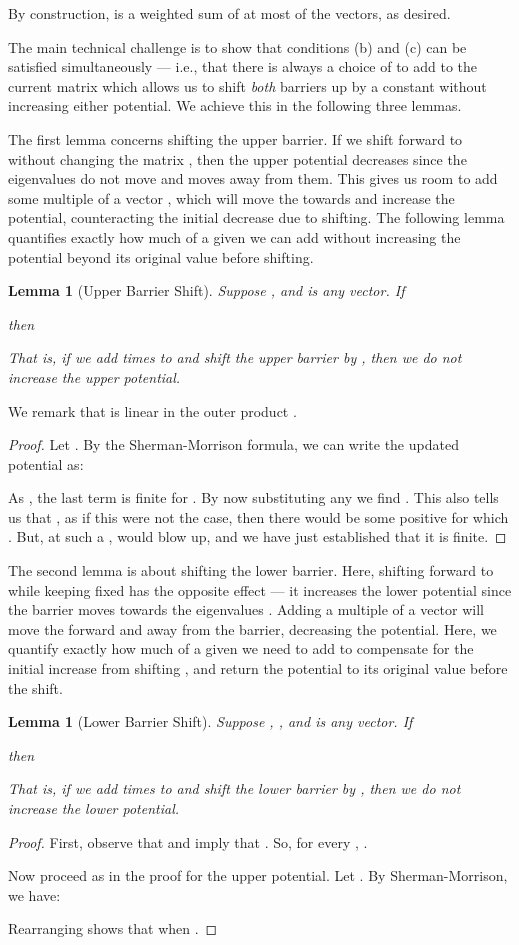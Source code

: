 \documentclass[12pt]{article}
\newtheorem{lemma}[theorem]{Lemma}
\begin{document}
By construction,  is a weighted sum of at most  of the vectors, as
desired.

The main technical challenge is to show that conditions (b) and (c) can be
satisfied simultaneously --- i.e., that there is always a choice of  to
add to the current matrix which allows us to shift {\em both} barriers up by a 
constant without increasing either potential. We achieve this in the following
three lemmas.

The first lemma concerns shifting the upper barrier. If we shift  forward to
   without changing the matrix , then the upper potential
   decreases since the eigenvalues  do not move and  moves away from
  them.
This gives us room to add some multiple of a vector , which will
  move the  towards  and increase the potential, counteracting the
  initial decrease due to shifting.
The following lemma quantifies exactly how much of a given  we can add
  without increasing the potential beyond its original value before shifting.

\begin{lemma}[Upper Barrier Shift]\label{lem:upperupd} Suppose ,
  and  is any vector. If 

then 

That is, if we add  times  to  and shift the upper barrier
by , then we do not increase the upper potential.
\end{lemma}
\noindent We remark that  is linear in the outer product .
\begin{proof}
Let . By the Sherman-Morrison formula, we can write the updated
potential as:


As ,
  the last term is finite for .
By now substituting any 
   we find
  .
This also tells us that , 
  as if this were not the case, then there would be some positive
   for which .
But, at such a , 
  would blow up, and we have just established that it is finite.
\end{proof}

The second lemma is about shifting the lower barrier.
Here, shifting  forward to  while keeping  fixed has the
opposite effect --- it 
  increases the lower potential  since the barrier  moves 
  towards the eigenvalues .
Adding a multiple of a vector  will move the  forward and away
  from the barrier, decreasing the potential.
Here, we quantify exactly how much of a given  we need to add 
  to compensate for the initial increase from shifting , and return the potential to 
  its original value before the shift. 
\begin{lemma}[Lower Barrier Shift]\label{lem:lowerupd} Suppose ,
  ,
  and  is any vector. If

then 

That is, if we add  times  to  and shift the lower barrier by
, then we do not increase the lower potential.
\end{lemma}
\begin{proof} 
First, observe that  and  
  imply that .
So, for every , .

Now proceed as in the proof for the upper potential. Let .
By Sherman-Morrison, we have:

Rearranging shows that  when .
\end{proof}
\end{document}
